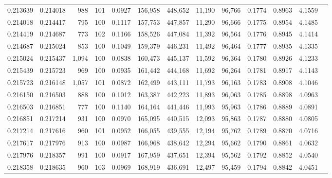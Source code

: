 \begin{tabular}{rrrrrrrrrrrrr}
0.213639 & 0.214018 &   988 & 101 &                                     0.0927 & 156,958 & 448,652 &  11,190 &  96,766 & 0.1774 & 0.8963 & 4.1559 \\
0.214018 & 0.214417 &   795 & 100 &                                     0.1117 & 157,753 & 447,857 &  11,290 &  96,666 & 0.1775 & 0.8954 & 4.1485 \\
0.214419 & 0.214687 &   773 & 102 &                                     0.1166 & 158,526 & 447,084 &  11,392 &  96,564 & 0.1776 & 0.8945 & 4.1414 \\
0.214687 & 0.215024 &   853 & 100 &                                     0.1049 & 159,379 & 446,231 &  11,492 &  96,464 & 0.1777 & 0.8935 & 4.1335 \\
0.215024 & 0.215437 & 1,094 & 100 &                                     0.0838 & 160,473 & 445,137 &  11,592 &  96,364 & 0.1780 & 0.8926 & 4.1233 \\
0.215439 & 0.215723 &   969 & 100 &                                     0.0935 & 161,442 & 444,168 &  11,692 &  96,264 & 0.1781 & 0.8917 & 4.1143 \\
0.215723 & 0.216148 & 1,057 & 101 &                                     0.0872 & 162,499 & 443,111 &  11,793 &  96,163 & 0.1783 & 0.8908 & 4.1046 \\
0.216150 & 0.216503 &   888 & 100 &                                     0.1012 & 163,387 & 442,223 &  11,893 &  96,063 & 0.1785 & 0.8898 & 4.0963 \\
0.216503 & 0.216851 &   777 & 100 &                                     0.1140 & 164,164 & 441,446 &  11,993 &  95,963 & 0.1786 & 0.8889 & 4.0891 \\
0.216851 & 0.217214 &   931 & 100 &                                     0.0970 & 165,095 & 440,515 &  12,093 &  95,863 & 0.1787 & 0.8880 & 4.0805 \\
0.217214 & 0.217616 &   960 & 101 &                                     0.0952 & 166,055 & 439,555 &  12,194 &  95,762 & 0.1789 & 0.8870 & 4.0716 \\
0.217617 & 0.217976 &   913 & 100 &                                     0.0987 & 166,968 & 438,642 &  12,294 &  95,662 & 0.1790 & 0.8861 & 4.0632 \\
0.217976 & 0.218357 &   991 & 100 &                                     0.0917 & 167,959 & 437,651 &  12,394 &  95,562 & 0.1792 & 0.8852 & 4.0540 \\
0.218358 & 0.218635 &   960 & 103 &                                     0.0969 & 168,919 & 436,691 &  12,497 &  95,459 & 0.1794 & 0.8842 & 4.0451 \\

\end{tabular}
